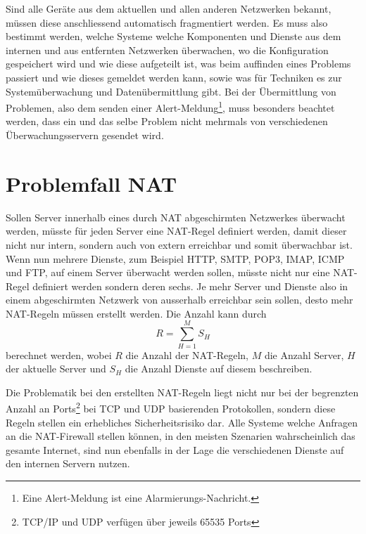 Sind alle Ger\"ate aus dem aktuellen und allen anderen Netzwerken bekannt, m\"ussen diese anschliessend automatisch fragmentiert werden. Es muss also bestimmt werden, welche Systeme welche Komponenten und Dienste aus dem internen und aus entfernten Netzwerken \"uberwachen, wo die Konfiguration gespeichert wird und wie diese aufgeteilt ist, was beim auffinden eines Problems passiert und wie dieses gemeldet werden kann, sowie was f\"ur Techniken es zur System\"uberwachung und Daten\"ubermittlung gibt. Bei der \"Ubermittlung von Problemen, also dem senden einer Alert-Meldung\footnote{Eine Alert-Meldung ist eine Alarmierungs-Nachricht.}, muss besonders beachtet werden, dass ein und das selbe Problem nicht mehrmals von verschiedenen \"Uberwachungsservern gesendet wird.


\section{Problemfall NAT} \label{sec:theorie-nat} 
Sollen Server innerhalb eines durch NAT abgeschirmten Netzwerkes \"uberwacht werden, m\"usste f\"ur jeden Server eine NAT-Regel definiert werden, damit dieser nicht nur intern, sondern auch von extern erreichbar und somit \"uberwachbar ist. Wenn nun mehrere Dienste, zum Beispiel HTTP\cite{rfc1945}\cite{rfc2616}, SMTP\cite{rfc5321}, POP3\cite{rfc1939}, IMAP\cite{rfc3501}, ICMP\cite{rfc792} und FTP\cite{rfc959}, auf einem Server \"uberwacht werden sollen, m\"usste nicht nur eine NAT-Regel definiert werden sondern deren sechs. Je mehr Server und Dienste also in einem abgeschirmten Netzwerk von ausserhalb erreichbar sein sollen, desto mehr NAT-Regeln m\"ussen erstellt werden. Die Anzahl kann durch
\begin{equation}
R = \sum_{H=1}^{M} {S_H}
\label{eq:theorie-nat}
\end{equation}
berechnet werden, wobei $R$ die Anzahl der NAT-Regeln, $M$ die Anzahl Server, $H$ der aktuelle Server und $S_H$ die Anzahl Dienste auf diesem beschreiben.

Die Problematik bei den erstellten NAT-Regeln liegt nicht nur bei der begrenzten Anzahl an Ports\footnote{\label{foot:theorie-ports}TCP/IP und UDP verf\"ugen \"uber jeweils 65535 Ports} bei TCP\cite{rfc675} und UDP\cite{rfc768} basierenden Protokollen, sondern diese Regeln stellen ein erhebliches Sicherheitsrisiko dar. Alle Systeme welche Anfragen an die NAT-Firewall stellen k\"onnen, in den meisten Szenarien wahrscheinlich das gesamte Internet, sind nun ebenfalls in der Lage die verschiedenen Dienste auf den internen Servern nutzen.

